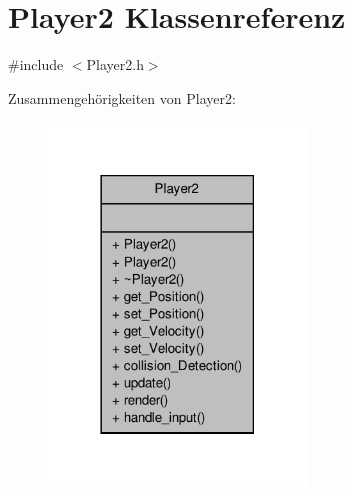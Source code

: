 \hypertarget{class_player2}{\section{Player2 Klassenreferenz}
\label{class_player2}
}


{\ttfamily \#include $<$Player2.\-h$>$}



Zusammengehörigkeiten von Player2\-:
\nopagebreak
\begin{figure}[H]
\begin{center}
\leavevmode
\includegraphics[width=194pt]{class_player2__coll__graph}
\end{center}
\end{figure}
